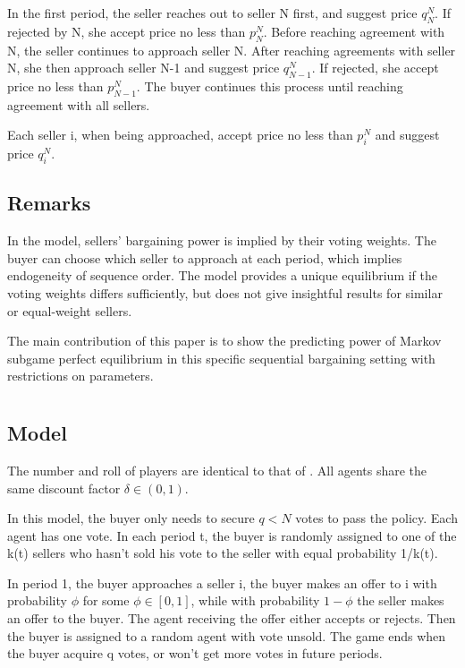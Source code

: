 \documentclass[ProjectGAZ]{subfiles}
\begin{document}
In the first period, the seller reaches out to seller N first, and suggest price $q_N^N$. If rejected by N, she accept price no less than $p_N^N$. Before reaching agreement with N, the seller continues to approach seller N. After reaching agreements with seller N, she then approach seller N-1 and suggest price $q_{N-1}^N$. If rejected, she accept price no less than $p_{N-1}^N$. The buyer continues this process until reaching agreement with all sellers.

Each seller i, when being approached, accept price no less than $p_i^N$ and suggest price $q_i^N$.

\subsection{Remarks}\label{subsec:Xiao-Remarks}

In the \cite{Xiao} model, sellers' bargaining power is implied by their voting weights. The buyer can choose which seller to approach at each period, which implies endogeneity of sequence order. The model provides a unique equilibrium if the voting weights differs sufficiently, but does not give insightful results for similar or equal-weight sellers.

The main contribution of this paper is to show the predicting power of Markov subgame perfect equilibrium in this specific sequential bargaining setting with restrictions on parameters.

\section{\cite{InOCoHoldUP}}

\subsection{Model}\label{subsec:InO-Model}

The number and roll of players are identical to that of \cite{Xiao}. All agents share the same discount factor $\delta \in (0, 1)$.

In this model, the buyer only needs to secure $q < N$ votes to pass the policy. Each agent has one vote. In each period t, the buyer is randomly assigned to one of the k(t) sellers who hasn't sold his vote to the seller with equal probability 1/k(t).  

In period 1, the buyer approaches a seller i, the buyer makes an offer to i with probability $\phi$ for some $\phi \in [0,1]$, while with probability $1 - \phi$ the seller makes an offer to the buyer. The agent receiving the offer either accepts or rejects. Then the buyer is assigned to a random agent with vote unsold. The game ends when the buyer acquire q votes, or won't get more votes in future periods.
\end{document}
